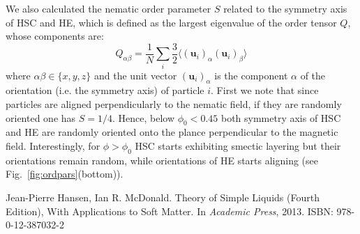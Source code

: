 \documentclass{article}
\begin{document}
We also calculated the nematic order parameter $S$ related to the symmetry axis of HSC and HE, which
is defined as the largest eigenvalue of the order tensor $Q$, whose components are:
\begin{equation}
Q_{\alpha\beta} = \frac{1}{N} \sum_i \frac{3}{2} \langle (\mathbf{u}_i)_\alpha (\mathbf{u}_i)_\beta\rangle
\label{eq:nemop}
\end{equation}
where $\alpha\beta\in\{x,y,z\}$ and the unit vector $(\mathbf{u}_i)_\alpha$ is the component $\alpha$ of the orientation (i.e. the symmetry axis) of particle $i$.
First we note that since particles are aligned perpendicularly to the nematic field, if they are 
randomly oriented one has $S=1/4$. Hence, below $\phi_0 < 0.45$ both symmetry axis of HSC and HE are 
randomly oriented onto the plance perpendicular to the magnetic field.
Interestingly, for $\phi > \phi_0$ HSC starts exhibiting smectic layering but their orientations
remain random, while orientations of HE starts aligning (see Fig.~\ref{fig:ordpars}(bottom)).

\begin{thebibliography}{1}
Jean-Pierre Hansen, Ian R. McDonald.
\newblock Theory of Simple Liquids (Fourth Edition), With Applications to Soft Matter.
\newblock In {\em Academic Press}, 2013. ISBN: 978-0-12-387032-2


\end{thebibliography}
\end{document}
